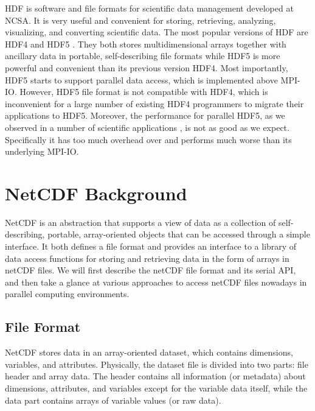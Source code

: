 \documentclass[10pt,twocolumn]{article}          %
\begin{document}
HDF is software and file formats for scientific data management developed at NCSA. It is very
useful and convenient for storing, retrieving, analyzing, visualizing, and converting scientific
data. The most popular versions of HDF are HDF4 \cite{HDF4} and HDF5 \cite{HDF5}. They both stores
multidimensional arrays together with ancillary data in portable, self-describing file formats
while HDF5 is more powerful and convenient than its previous version HDF4. Most importantly, HDF5
starts to support parallel data access, which is implemented above MPI-IO. However, HDF5 file
format is not compatible with HDF4, which is inconvenient for a large number of existing HDF4
programmers to migrate their applications to HDF5. Moreover, the performance for parallel HDF5, as
we observed in a number of scientific applications \cite{LLCT02, RNCZ01}, is not as good as we
expect. Specifically it has too much overhead over and performs much worse than its underlying
MPI-IO.

\section{NetCDF Background}

NetCDF is an abstraction that supports a view of data as a collection of self-describing, portable,
array-oriented objects that can be accessed through a simple interface. It both defines a file
format and provides an interface to a library of data access functions for storing and retrieving
data in the form of arrays in netCDF files. We will first describe the netCDF file format and its
serial API, and then take a glance at various approaches to access netCDF files nowadays in
parallel computing environments.

\subsection{File Format}

NetCDF stores data in an array-oriented dataset, which contains dimensions, variables, and
attributes. Physically, the dataset file is divided into two parts: file header and array data. The
header contains all information (or metadata) about dimensions, attributes, and variables except
for the variable data itself, while the data part contains arrays of variable values (or raw data).
\end{document}
